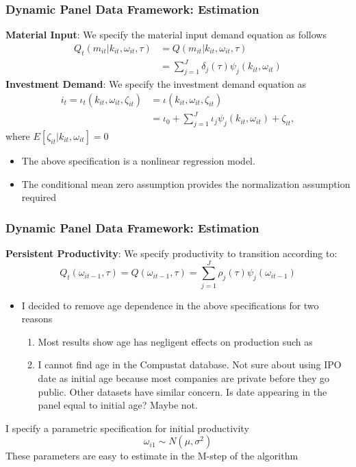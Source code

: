 \documentclass{beamer}
\begin{document}
\begin{frame}
\frametitle{Dynamic Panel Data Framework: Estimation}
\textbf{Material Input}:
We specify the material input demand equation as follows
\begin{equation}\label{mmodel}
\begin{split}
Q_{t}(m_{it}|k_{it}, \omega_{it}, \tau)&=Q(m_{it}|k_{it}, \omega_{it}, \tau)\\
&=\sum_{j=1}^{J}\delta_{j}(\tau)\psi_{j}(k_{it}, \omega_{it})
\end{split}
\end{equation}
\textbf{Investment Demand}:
We specify the investment demand equation as
\begin{equation}\label{imodel}
\begin{split}
i_{t}=\iota_{t}(k_{it}, \omega_{it}, \zeta_{it})&=\iota(k_{it}, \omega_{it}, \zeta_{it})\\
&=\iota_{0}+\sum_{j=1}^{J}\iota_{j}\psi_{j}(k_{it}, \omega_{it})+\zeta_{it},
\end{split}
\end{equation}
where $E[\zeta_{it}|k_{it}, \omega_{it}]=0$
\begin{itemize}
	\item The above specification is a nonlinear regression model.
	\item The conditional mean zero assumption provides the normalization assumption required
\end{itemize}
\end{frame}


\begin{frame}
\frametitle{Dynamic Panel Data Framework: Estimation}
\textbf{Persistent Productivity}:
We specify productivity to transition according to:
\begin{equation}\label{omegamodel}
Q_{t}(\omega_{it-1}, \tau)=Q(\omega_{it-1}, \tau)=\sum_{j=1}^{J}\rho_{j}(\tau)\psi_{j}(\omega_{it-1})
\end{equation}
\begin{itemize}
	\item I decided to remove age dependence in the above specifications for two reasons
	\begin{enumerate}
		\item Most results show age has negligent effects on production such as \cite{Olley1996}
		\item I cannot find age in the Compustat database. Not sure about using IPO date as initial age because most companies are private before they go public. Other datasets have similar concern. Is date appearing in the panel equal to initial age? Maybe not.
	\end{enumerate}
\end{itemize}
I specify a parametric specification for initial productivity 
\begin{equation}\label{omegamodel}
\omega_{i1}\sim N(\mu, \sigma^{2})
\end{equation}
These parameters are easy to estimate in the M-step of the algorithm
\end{frame}
\end{document}
